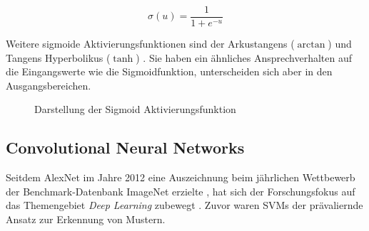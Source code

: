 \begin{equation}\label{eq:sigmoid}
	\sigma(u) = \frac{1}{1 + e^{-u}}
\end{equation}


Weitere sigmoide Aktivierungsfunktionen sind der Arkustangens ($\arctan$) und Tangens Hyperbolikus ($\tanh$) \cite[195-201]{Networks1995}. Sie haben ein ähnliches Ansprechverhalten auf die Eingangswerte wie die Sigmoidfunktion, unterscheiden sich aber in den Ausgangsbereichen. 

\begin{figure}[htb]
\centering
{}
\caption{Darstellung der Sigmoid Aktivierungsfunktion}
\end{figure}

\subsection{Convolutional Neural Networks}

Seitdem \gls{AlexNet} im Jahre 2012 eine Auszeichnung beim jährlichen Wettbewerb der Benchmark-Datenbank ImageNet erzielte \cite{imagenet}, hat sich der Forschungsfokus auf das Themengebiet \emph{Deep Learning} zubewegt \cites{NIPS2012_c399862d, rastegari2016xnornet, russakovsky2015imagenet}. Zuvor waren \acp{SVM} der prävaliernde Ansatz zur Erkennung von Mustern.

